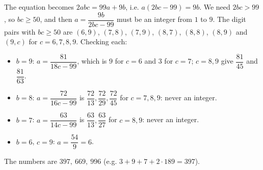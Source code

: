 The equation becomes $2abc=99a+9b$, i.e. $a(2bc-99)=9b$. We need $2bc>99$, so $bc\ge50$, and then $a=\dfrac{9b}{2bc-99}$ must be an integer from $1$ to $9$. The digit pairs with $bc\ge50$ are $(6,9)$, $(7,8)$, $(7,9)$, $(8,7)$, $(8,8)$, $(8,9)$ and $(9,c)$ for $c=6,7,8,9$. Checking each:
\begin{itemize}
\item $b=9$: $a=\dfrac{81}{18c-99}$, which is $9$ for $c=6$ and $3$ for $c=7$; $c=8,9$ give $\dfrac{81}{45}$ and $\dfrac{81}{63}$.
\item $b=8$: $a=\dfrac{72}{16c-99}$ is $\dfrac{72}{13},\dfrac{72}{29},\dfrac{72}{45}$ for $c=7,8,9$: never an integer.
\item $b=7$: $a=\dfrac{63}{14c-99}$ is $\dfrac{63}{13},\dfrac{63}{27}$ for $c=8,9$: never an integer.
\item $b=6$, $c=9$: $a=\dfrac{54}{9}=6$.
\end{itemize}
The numbers are $\boxed{397,\ 669,\ 996}$ (e.g. $3+9+7+2\cdot189=397$).
